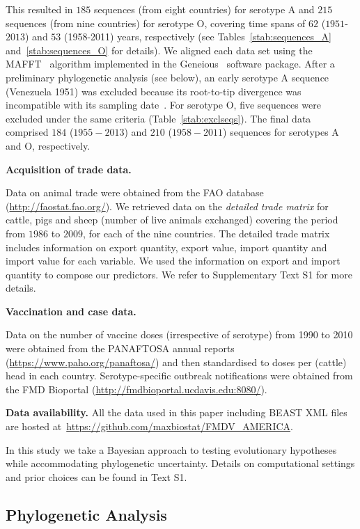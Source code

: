 \documentclass[10pt]{article}
\begin{document}
This resulted in $185$ sequences (from eight countries) for serotype A and $215$ sequences (from nine countries) for serotype O, covering time spans of $62$ ($1951$-$2013$) and $53$ (1958-2011) years, respectively (see Tables~\ref{stab:sequences_A} and~\ref{stab:sequences_O} for details).
We aligned each data set using the MAFFT~\citep{Katoh2002} algorithm implemented in the Geneious~\citep{Kearse2012} software package.
After a preliminary phylogenetic analysis (see below), an early serotype A sequence (Venezuela 1951) was excluded because its root-to-tip divergence was incompatible with its sampling date~\citep{Rambaut2016}.
For serotype O, five sequences were excluded under the same criteria (Table~\ref{stab:exclseqs}).
The final data comprised $184$ ($1955-2013$) and $210$ ($1958-2011$) sequences for serotypes A and O, respectively.

\textbf{Acquisition of trade data.}

Data on animal trade were obtained from the FAO database (\url{http://faostat.fao.org/}).
We retrieved data on the \textit{detailed trade matrix} %
for cattle, pigs and sheep (number of live animals exchanged) covering the period from $1986$ to $2009$, for each of the nine countries.
The detailed trade matrix includes information on export quantity, export value, import quantity and import value for each variable.
We used the information on export and import quantity to compose our predictors.
We refer to Supplementary Text S1 for more details.

\textbf{Vaccination and case data.}

Data on the number of vaccine doses (irrespective of serotype) from 1990 to 2010 were obtained from the PANAFTOSA annual reports (\url{https://www.paho.org/panaftosa/}) and then standardised to doses per (cattle) head in each country.
Serotype-specific outbreak notifications were obtained from the FMD Bioportal (\url{http://fmdbioportal.ucdavis.edu:8080/}).

\textbf{Data availability.} All the data used in this paper including BEAST XML files are hosted at~\url{https://github.com/maxbiostat/FMDV_AMERICA}.

In this study we take a Bayesian approach to testing evolutionary hypotheses while accommodating phylogenetic uncertainty.
Details on computational settings and prior choices can be found in Text S1.

\subsection*{Phylogenetic Analysis}
\end{document}
